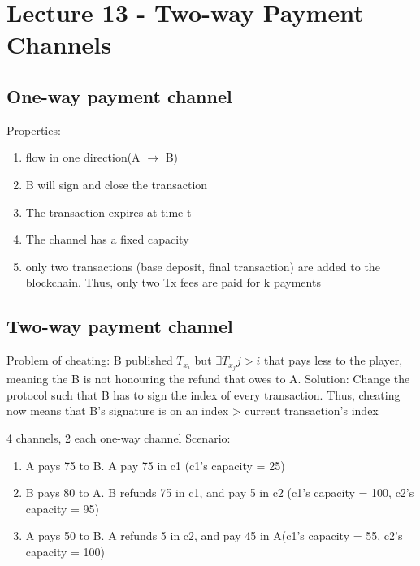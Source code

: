 \documentclass[../main.tex]{subfile}
\begin{document}
\newtheorem{theorem}{Theorem}
\newtheorem{example}{Example}[theorem]
\newtheorem{task}{Task}
\newtheorem{definition}{Definition}
\section{Lecture 13 - Two-way Payment Channels}
\subsection{One-way payment channel}
Properties:
\begin{enumerate}
	\item flow in one direction(A $\to$ B)
	\item B will sign and close the transaction
	\item The transaction expires at time t
	\item The channel has a fixed capacity
	\item only two transactions (base deposit, final transaction) are added to the blockchain. Thus, only two Tx fees are paid for k payments
\end{enumerate}
\subsection{Two-way payment channel}
Problem of cheating:
 B published $T_{x_{i}}$ but $\exists  T_{x_{j}} j > i$ that pays less to the player, meaning the B is not honouring the refund that owes to A.
Solution: Change the protocol such that B has to sign the index of every transaction. 
Thus, cheating now means that B's signature is on an index > current transaction's index

4 channels, 2 each one-way channel
Scenario:
\begin{enumerate}
	\item A pays 75 to B. A pay 75 in c1  (c1's capacity = 25)
	\item B pays 80 to A. B refunds 75 in c1, and pay 5 in c2 (c1's capacity = 100, c2's capacity = 95)
	\item A pays 50 to B. A refunds 5 in c2, and pay 45 in A(c1's capacity = 55, c2's capacity = 100)
\end{enumerate}
\end{document}
